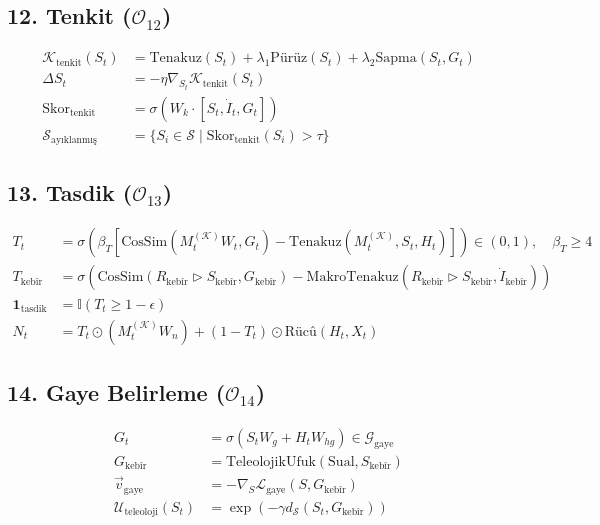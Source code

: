 \documentclass[11pt, a4paper]{article}
\begin{document}
\subsection{12. Tenkit ($\mathcal{O}_{12}$)}
\begin{align}
\mathcal{K}_{\text{tenkit}}(S_t) &= \text{Tenakuz}(S_t) + \lambda_1 \text{Pürüz}(S_t) + \lambda_2 \text{Sapma}(S_t, G_t) \\
\Delta S_t &= -\eta \nabla_{S_t} \mathcal{K}_{\text{tenkit}}(S_t) \\
\text{Skor}_{\text{tenkit}} &= \sigma\left( W_k \cdot [S_t, \dot{I}_t, G_t] \right) \\
\mathcal{S}_{\text{ayıklanmış}} &= \{ S_i \in \mathcal{S} \mid \text{Skor}_{\text{tenkit}}(S_i) > \tau \}
\end{align}

\subsection{13. Tasdik ($\mathcal{O}_{13}$)}
\begin{align}
T_t &= \sigma\left( \beta_T \left[ \text{CosSim}(M_t^{(\mathcal{K})} W_t, G_t) - \text{Tenakuz}(M_t^{(\mathcal{K})}, S_t, H_t) \right] \right) \in (0,1), \quad \beta_T \ge 4 \\
T_{\text{kebîr}} &= \sigma\left( \text{CosSim}(R_{\text{kebîr}} \triangleright S_{\text{kebîr}}, G_{\text{kebîr}}) - \text{MakroTenakuz}(R_{\text{kebîr}} \triangleright S_{\text{kebîr}}, \dot{I}_{\text{kebîr}}) \right) \\
\mathbf{1}_{\text{tasdik}} &= \mathbb{I}(T_t \ge 1 - \epsilon) \\
N_t &= T_t \odot (M_t^{(\mathcal{K})} W_n) + (1 - T_t) \odot \text{Rücû}(H_t, X_t)
\end{align}

\subsection{14. Gaye Belirleme ($\mathcal{O}_{14}$)}
\begin{align}
G_t &= \sigma(S_t W_g + H_t W_{hg}) \in \mathcal{G}_{\text{gaye}} \\
G_{\text{kebîr}} &= \text{TeleolojikUfuk}(\text{Sual}, S_{\text{kebîr}}) \\
\vec{v}_{\text{gaye}} &= -\nabla_{S} \mathcal{L}_{\text{gaye}}(S, G_{\text{kebîr}}) \\
\mathcal{U}_{\text{teleoloji}}(S_t) &= \exp\left( -\gamma d_{\mathcal{S}}(S_t, G_{\text{kebîr}}) \right)
\end{align}
\end{document}
